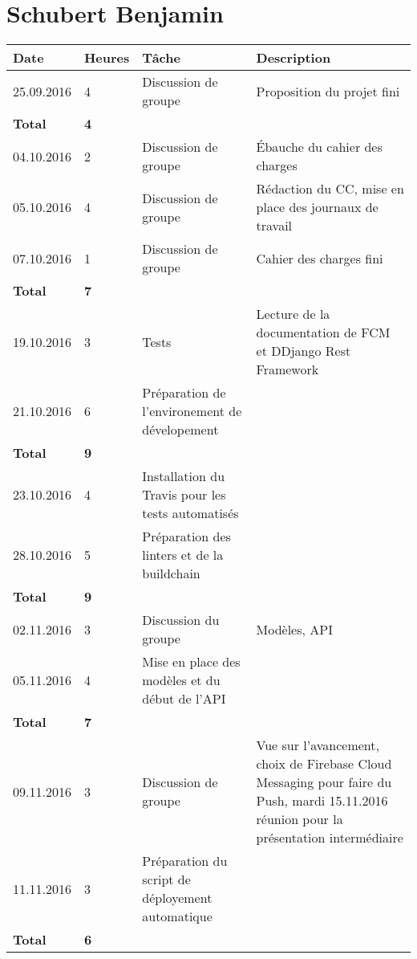 \documentclass[french]{article}
\begin{document}
	\section*{Schubert Benjamin}
	\begin{longtable}{p{}|p{}|p{}|p{}}
		Date&Heures&Tâche&Description\\
		\hline \hline
		25.09.2016 & 4 & Discussion de groupe & Proposition du projet fini\\
		\textbf{Total} & \textbf{4} &&\\
		\hline

		04.10.2016 & 2 & Discussion de groupe & Ébauche du cahier des charges\\
		05.10.2016 & 4 & Discussion de groupe & Rédaction du CC, mise en place des journaux de travail\\
		07.10.2016 & 1 & Discussion de groupe & Cahier des charges fini\\
		\textbf{Total} & \textbf{7} &&\\
		\hline

		19.10.2016 & 3 & Tests & Lecture de la documentation de FCM et DDjango Rest Framework\\
		21.10.2016 & 6 & Préparation de l'environement de dévelopement\\
		\textbf{Total} & \textbf{9} &&\\
		\hline

		23.10.2016 & 4 & Installation du Travis pour les tests automatisés\\
		28.10.2016 & 5 & Préparation des linters et de la buildchain\\
		\textbf{Total} & \textbf{9} &&\\
		\hline

		02.11.2016 & 3 & Discussion du groupe & Modèles, API\\
		05.11.2016 & 4 & Mise en place des modèles et du début de l'API\\
		\textbf{Total} & \textbf{7} &&\\
		\hline

		09.11.2016 & 3 & Discussion de groupe & Vue sur l'avancement, choix de Firebase Cloud Messaging pour faire du Push, mardi 15.11.2016 réunion pour la présentation intermédiaire\\
		11.11.2016 & 3 & Préparation du script de déployement automatique\\
		\textbf{Total} & \textbf{6} &&\\
		\hline


\end{longtable}
\end{document}
